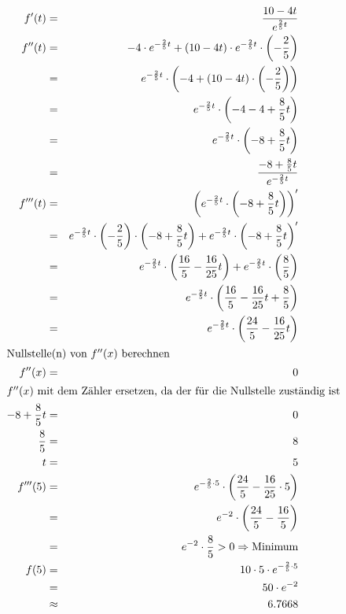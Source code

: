 \documentclass[10pt,a4paper,oneside,ngerman,numbers=noenddot]{scrartcl}
\begin{document}
\subsection{} %
\begin{alignat*}{2}
f'(t) &=& \frac{10-4t}{e^{\frac{2}{5}t}} \\
f''(t) &=& -4 \cdot e^{-\frac{2}{5}t} + (10 - 4t) \cdot e^{-\frac{2}{5}t} \cdot \left(-\frac{2}{5}\right) \\
&=& e^{-\frac{2}{5}t} \cdot \left(-4 + (10 - 4t) \cdot \left(-\frac{2}{5}\right) \right) \\
&=& e^{-\frac{2}{5}t} \cdot \left(-4 - 4 + \frac{8}{5}t \right) \\
&=& e^{-\frac{2}{5}t} \cdot \left(-8 + \frac{8}{5}t \right) \\
&=& \frac{-8 + \frac{8}{5}t}{ e^{-\frac{2}{5}t}} \\
f'''(t) &=& \left(e^{-\frac{2}{5}t} \cdot \left(-8 + \frac{8}{5}t \right)\right)' \\
&=& e^{-\frac{2}{5}t} \cdot \left(-\frac{2}{5} \right) \cdot \left(-8 + \frac{8}{5}t \right) + e^{-\frac{2}{5}t} \cdot  \left(-8 + \frac{8}{5}t \right)' \\
&=& e^{-\frac{2}{5}t} \cdot \left(\frac{16}{5} - \frac{16}{25}t \right) + e^{-\frac{2}{5}t} \cdot \left(\frac{8}{5}\right) \\
&=& e^{-\frac{2}{5}t} \cdot \left(\frac{16}{5} - \frac{16}{25}t + \frac{8}{5}\right) \\
&=& e^{-\frac{2}{5}t} \cdot \left(\frac{24}{5} - \frac{16}{25}t\right) \\
\intertext{Nullstelle(n) von $f''(x)$ berechnen}
f''(x) &=& 0 \\
\intertext{$f''(x)$ mit dem Zähler ersetzen, da der für die Nullstelle zuständig ist}
-8 + \frac{8}{5}t &=& 0 \\
\frac{8}{5} &=& 8 \\
t &=& 5 \\
f'''(5) &=& e^{-\frac{2}{5} \cdot 5} \cdot \left(\frac{24}{5} - \frac{16}{25} \cdot 5\right) \\
&=& e^{-2} \cdot \left(\frac{24}{5} - \frac{16}{5}\right) \\
&=& e^{-2} \cdot \frac{8}{5} > 0 \Rightarrow \text{Minimum} \\
f(5) &=& 10 \cdot 5 \cdot e^{-\frac{2}{5} \cdot 5} \\
&=& 50 \cdot e^{-2} \\
&\approx & 6.7668
\end{alignat*}
\end{document}

